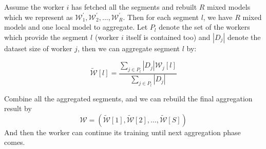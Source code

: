  Assume the worker $i$ has fetched all the segments and rebuilt $R$ mixed models which we represent as $\mathcal{W}^\prime_1,\mathcal{W}^\prime_2, \dots ,\mathcal{W}^\prime_R$. Then for each segment $l$, we have $R$ mixed models and one local model to aggregate. Let $P_l$ denote the set of the workers which provide the segment $l$ (worker $i$ itself is contained too) and $|D_j|$ denote the dataset size of worker $j$, then we can aggregate segment $l$ by:
 
 \begin{equation}
 \label{eq:seg_agg}
     \widetilde{\mathcal{W}}[l] = \frac{\sum_{j\in P_l}|D_j|\mathcal{W}_j[l]}{\sum_{j\in P_l}|D_j|}
 \end{equation}

Combine all the aggregated segments, and we can rebuild the final aggregation result by 
\begin{equation}
    \mathcal{W} = (\widetilde{\mathcal{W}}[1],\widetilde{\mathcal{W}}[2],\dots,\widetilde{\mathcal{W}}[S])
\end{equation}
And then the worker can continue its training until next aggregation phase comes.
